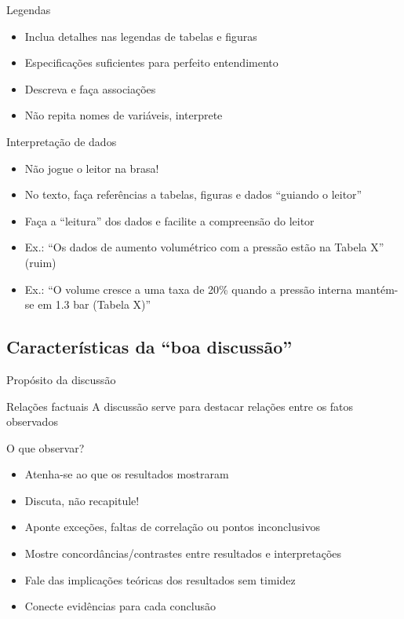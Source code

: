 \begin{frame}{Legendas}
\begin{itemize}
\item Inclua detalhes nas legendas de tabelas e figuras  
\item Especificações suficientes para perfeito entendimento
\item Descreva e faça associações 
\item Não repita nomes de variáveis, interprete 
\end{itemize}
\end{frame}

\begin{frame}{Interpretação de dados}
\begin{itemize}
\item Não jogue o leitor na brasa!
\item No texto, faça referências a tabelas, figuras e dados ``guiando o leitor''
\item Faça a ``leitura'' dos dados e facilite a compreensão do leitor
\item Ex.: ``Os dados de aumento volumétrico com a pressão estão na Tabela X'' (ruim)
\item Ex.: ``O volume cresce a uma taxa de 20\% quando a pressão interna mantém-se em 1.3 bar (Tabela X)''
\end{itemize}
\end{frame}

\subsection{Características da ``boa discussão''}

\begin{frame}{Propósito da discussão}
\begin{block}{Relações factuais}
A discussão serve para destacar relações entre os fatos observados
\end{block}
\end{frame}

\begin{frame}{O que observar?}
\begin{itemize}
\item Atenha-se ao que os resultados mostraram 
\item Discuta, não recapitule! 
\item Aponte exceções, faltas de correlação ou pontos inconclusivos
\item Mostre concordâncias/contrastes entre resultados e interpretações 
\item Fale das implicações teóricas dos resultados sem timidez 
\item Conecte evidências para cada conclusão
\end{itemize}
\end{frame}

